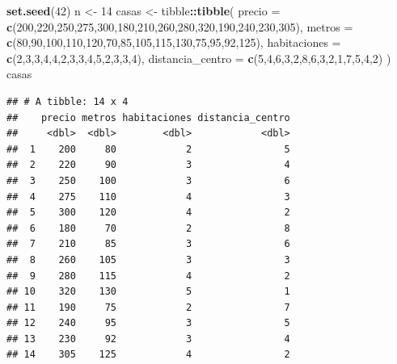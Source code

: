 \documentclass[
]{book}
\newenvironment{Shaded}{\begin{snugshade}}{\end{snugshade}}
\newcommand{\AttributeTok}[1]{\textcolor[rgb]{0.13,0.29,0.53}{#1}}
\newcommand{\DecValTok}[1]{\textcolor[rgb]{0.00,0.00,0.81}{#1}}
\newcommand{\FunctionTok}[1]{\textcolor[rgb]{0.13,0.29,0.53}{\textbf{#1}}}
\newcommand{\NormalTok}[1]{#1}
\newcommand{\OtherTok}[1]{\textcolor[rgb]{0.56,0.35,0.01}{#1}}
\newcommand{\SpecialCharTok}[1]{\textcolor[rgb]{0.81,0.36,0.00}{\textbf{#1}}}
\begin{document}
\begin{Shaded}
\begin{Highlighting}[]
\FunctionTok{set.seed}\NormalTok{(}\DecValTok{42}\NormalTok{)}
\NormalTok{n }\OtherTok{\textless{}{-}} \DecValTok{14}
\NormalTok{casas }\OtherTok{\textless{}{-}}\NormalTok{ tibble}\SpecialCharTok{::}\FunctionTok{tibble}\NormalTok{(}
  \AttributeTok{precio =} \FunctionTok{c}\NormalTok{(}\DecValTok{200}\NormalTok{,}\DecValTok{220}\NormalTok{,}\DecValTok{250}\NormalTok{,}\DecValTok{275}\NormalTok{,}\DecValTok{300}\NormalTok{,}\DecValTok{180}\NormalTok{,}\DecValTok{210}\NormalTok{,}\DecValTok{260}\NormalTok{,}\DecValTok{280}\NormalTok{,}\DecValTok{320}\NormalTok{,}\DecValTok{190}\NormalTok{,}\DecValTok{240}\NormalTok{,}\DecValTok{230}\NormalTok{,}\DecValTok{305}\NormalTok{),}
  \AttributeTok{metros =} \FunctionTok{c}\NormalTok{(}\DecValTok{80}\NormalTok{,}\DecValTok{90}\NormalTok{,}\DecValTok{100}\NormalTok{,}\DecValTok{110}\NormalTok{,}\DecValTok{120}\NormalTok{,}\DecValTok{70}\NormalTok{,}\DecValTok{85}\NormalTok{,}\DecValTok{105}\NormalTok{,}\DecValTok{115}\NormalTok{,}\DecValTok{130}\NormalTok{,}\DecValTok{75}\NormalTok{,}\DecValTok{95}\NormalTok{,}\DecValTok{92}\NormalTok{,}\DecValTok{125}\NormalTok{),}
  \AttributeTok{habitaciones =} \FunctionTok{c}\NormalTok{(}\DecValTok{2}\NormalTok{,}\DecValTok{3}\NormalTok{,}\DecValTok{3}\NormalTok{,}\DecValTok{4}\NormalTok{,}\DecValTok{4}\NormalTok{,}\DecValTok{2}\NormalTok{,}\DecValTok{3}\NormalTok{,}\DecValTok{3}\NormalTok{,}\DecValTok{4}\NormalTok{,}\DecValTok{5}\NormalTok{,}\DecValTok{2}\NormalTok{,}\DecValTok{3}\NormalTok{,}\DecValTok{3}\NormalTok{,}\DecValTok{4}\NormalTok{),}
  \AttributeTok{distancia\_centro =} \FunctionTok{c}\NormalTok{(}\DecValTok{5}\NormalTok{,}\DecValTok{4}\NormalTok{,}\DecValTok{6}\NormalTok{,}\DecValTok{3}\NormalTok{,}\DecValTok{2}\NormalTok{,}\DecValTok{8}\NormalTok{,}\DecValTok{6}\NormalTok{,}\DecValTok{3}\NormalTok{,}\DecValTok{2}\NormalTok{,}\DecValTok{1}\NormalTok{,}\DecValTok{7}\NormalTok{,}\DecValTok{5}\NormalTok{,}\DecValTok{4}\NormalTok{,}\DecValTok{2}\NormalTok{)}
\NormalTok{)}
\NormalTok{casas}
\end{Highlighting}
\end{Shaded}

\begin{verbatim}
## # A tibble: 14 x 4
##    precio metros habitaciones distancia_centro
##     <dbl>  <dbl>        <dbl>            <dbl>
##  1    200     80            2                5
##  2    220     90            3                4
##  3    250    100            3                6
##  4    275    110            4                3
##  5    300    120            4                2
##  6    180     70            2                8
##  7    210     85            3                6
##  8    260    105            3                3
##  9    280    115            4                2
## 10    320    130            5                1
## 11    190     75            2                7
## 12    240     95            3                5
## 13    230     92            3                4
## 14    305    125            4                2
\end{verbatim}
\end{document}
